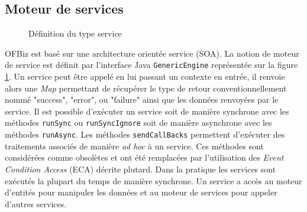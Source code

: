 \documentclass[a4paper, 11pt]{report}
\begin{document}
\subsection{Moteur de services}

\begin{figure}
  \centering
  \caption{Définition du type service}
  \label{fig:serviceengine}
\end{figure}

OFBiz est basé sur une architecture orientée service (SOA). La notion
de moteur de service est définit par l'interface Java
\verb=GenericEngine= représentée sur la figure
\ref{fig:serviceengine}.  Un service peut être appelé en lui passant
un contexte en entrée, il renvoie alors une \emph{Map} permettant de
récupérer le type de retour conventionnellement nommé "success",
"error", ou "failure" ainsi que les données renvoyées par le
service. Il est possible d'exécuter un service soit de manière
synchrone avec les méthodes \verb=runSync= ou \verb=runSyncIgnore=
soit de manière asynchrone avec les méthodes \verb=runAsync=. Les
méthodes \verb=sendCallBacks= permettent d'exécuter des traitements
associés de manière \emph{ad hoc} à un service. Ces méthodes sont
considérées comme obsolètes et ont été remplacées par l'utilisation
des \emph{Event Condition Access} (ECA) décrite plutard. Dans la
pratique les services sont exécutés la plupart du temps de manière
synchrone. Un service a accès au moteur d'entités pour manipuler les
données et au moteur de services pour appeler d'autres services.
\end{document}
